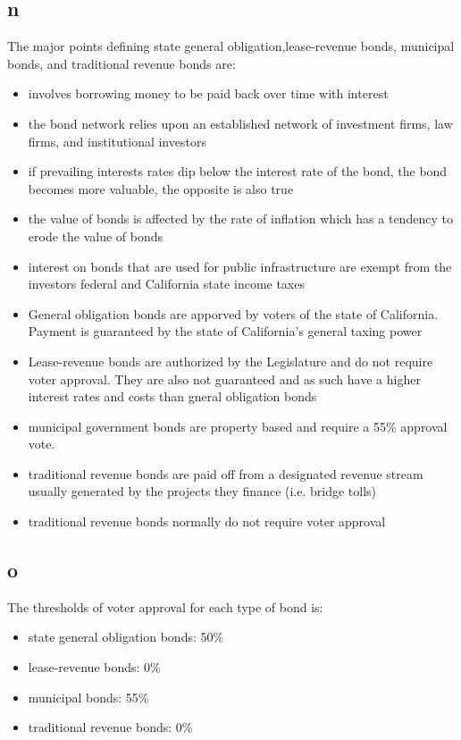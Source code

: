 \documentclass[12pt]{article} %
\begin{document}
	\subsection{n}
		The major points defining state general obligation,lease-revenue bonds, municipal bonds, and traditional revenue bonds are:
		\begin{itemize}
			\item involves borrowing money to be paid back over time with interest
			\item the bond network relies upon an established network of investment firms, law firms, and institutional investors
			\item if prevailing interests rates dip below the interest rate of the bond, the bond becomes more valuable, the opposite is also true
			\item the value of bonds is affected by the rate of inflation which has a tendency to erode the value of bonds
			\item interest on bonds that are used for public infrastructure are exempt from the investors federal and California state income taxes
			\item General obligation bonds are apporved by voters of the state of California. Payment is guaranteed by the state of California's general taxing power
			\item Lease-revenue bonds are authorized by the Legislature and do not require voter approval. They are also not guaranteed and as such have a higher interest rates and costs than gneral obligation bonds
			\item municipal government bonds are property based and require a 55\% approval vote.
			\item traditional revenue bonds are paid off from a designated revenue stream usually generated by the projects they finance (i.e. bridge tolls)
			\item traditional revenue bonds normally do not require voter approval
		\end{itemize}
	
	\subsection{o}
		The thresholds of voter approval for each type of bond is:
			\begin{itemize}
				\item state general obligation bonds: 50\%
				\item lease-revenue bonds: 0\%
				\item municipal bonds: 55\%
				\item traditional revenue bonds: 0\%
			\end{itemize}
	
\end{document}
